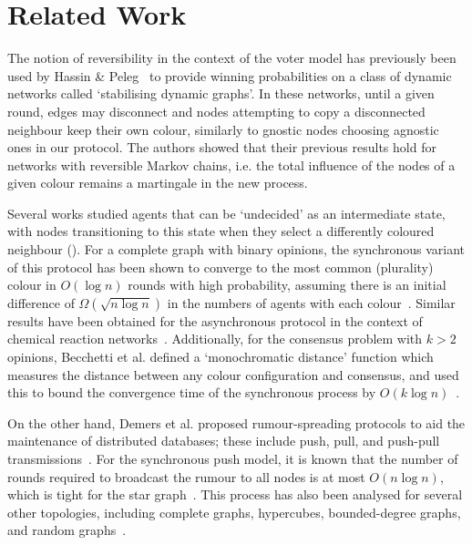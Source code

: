 \section{Related Work}
\label{sec:related_work}

The notion of reversibility in the context of the voter model has previously been used by Hassin \& Peleg~\cite{hassin2001distributed} to provide winning probabilities on a class of dynamic networks called `stabilising dynamic graphs'. 
In these networks, until a given round, edges may disconnect and nodes attempting to copy a disconnected neighbour keep their own colour, similarly to gnostic nodes choosing agnostic ones in our protocol. 
The authors showed that their previous results hold for networks with reversible Markov chains, i.e. the total influence of the nodes of a given colour remains a martingale in the new process.

Several works studied agents that can be `undecided' as an intermediate state, with nodes transitioning to this state when they select a differently coloured neighbour (\cite{angluin,perron, clementi_et_al:LIPIcs.MFCS.2018.28, petra1}). For a complete graph with binary opinions, the synchronous variant of this protocol has been shown to converge to the most common (plurality) colour in $O(\log n)$ rounds with high probability, assuming there is an initial difference of $\Omega(\sqrt{n \log n})$ in the numbers of agents with each colour~\cite{clementi2018tight}. Similar results have been obtained for the asynchronous protocol in the context of chemical reaction networks~\cite{condon2020approximate}. Additionally, for the consensus problem with $k>2$ opinions, Becchetti et al. defined a `monochromatic distance' function which measures the distance between any colour configuration and consensus, and used this to bound the convergence time of the synchronous process by $O(k \log n)$~\cite{becchetti2015plurality}. 

On the other hand, Demers et al. proposed rumour-spreading protocols to aid the maintenance of distributed databases; these include push, pull, and push-pull transmissions~\cite{demers1987epidemic}. For the synchronous push model, it is known that the number of rounds required to broadcast the rumour to all nodes is at most $O(n \log n)$, which is tight for the star graph~\cite{feige1990randomized}. This process has also been analysed for several other topologies, including complete graphs, hypercubes, bounded-degree graphs, and random graphs~\cite{feige1990randomized}.

